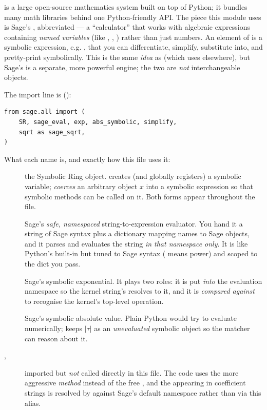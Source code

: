 \begin{defn}
 is a large open-source mathematics system built on top of Python;
it bundles many math libraries behind one Python-friendly API. The piece this
module uses is Sage's , abbreviated  --- a
``calculator'' that works with algebraic expressions containing \emph{named
variables} (like , , ) rather than just numbers. An
element of  is a symbolic expression, e.g. ,
that you can differentiate, simplify, substitute into, and pretty-print
symbolically. This is the same \emph{idea} as  (which \Daedalus{}
uses elsewhere), but Sage's  is a separate, more powerful engine; the two
are \emph{not} interchangeable objects.
\end{defn}

The import line is ():

\begin{lstlisting}
from sage.all import (
    SR, sage_eval, exp, abs_symbolic, simplify,
    sqrt as sage_sqrt,
)
\end{lstlisting}

What each name is, and exactly how this file uses it:

\begin{description}
  \item[] the Symbolic Ring object.  creates (and
        globally registers) a symbolic variable;  \emph{coerces} an
        arbitrary object $x$ into a symbolic expression so that symbolic methods
        can be called on it. Both forms appear throughout the file.
  \item[] Sage's \emph{safe, namespaced} string-to-expression
        evaluator. You hand it a string of Sage syntax plus a dictionary mapping
        names to Sage objects, and it parses and evaluates the string \emph{in
        that namespace only}. It is like Python's built-in  but tuned
        to Sage syntax (\code{\^{}} means power) and scoped to the dict you pass.
  \item[] Sage's symbolic exponential. It plays two roles: it is put
        \emph{into} the evaluation namespace so the kernel string's 
        resolves to it, and it is \emph{compared against} to recognise the kernel's
        top-level operation.
  \item[] Sage's symbolic absolute value. Plain Python
         would try to evaluate numerically;  keeps
        $|\tau|$ as an \emph{unevaluated} symbolic object so the matcher can reason
        about it.
  \item[, ] imported but \emph{not} called
        directly in this file. The code uses the more aggressive \emph{method}
         instead of the free , and the
         appearing in coefficient strings is resolved by
         against Sage's default namespace rather than via this
        alias.
\end{description}

